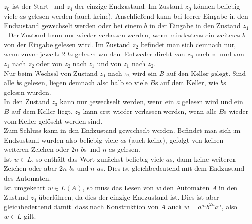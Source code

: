 \documentclass[10pt,a4paper,oneside,ngerman,numbers=noenddot]{scrartcl}
\begin{document}
\subsection{} %
$z_{0}$ ist der Start- und $z_{4}$ der einzige Endzustand. Im Zustand $z_{0}$ können beliebig viele $a$s gelesen werden (auch keine). Anschließend kann bei leerer Eingabe in den Endzustand gewechselt werden oder bei einem $b$ in der Eingabe in den Zustand $z_{1}$. Der Zustand kann nur wieder verlassen werden, wenn mindestens ein weiteres $b$ von der Eingabe gelesen wird. Im Zustand $z_{2}$ befindet man sich demnach nur, wenn zuvor jeweils 2 $b$s gelesen wurden. Entweder direkt von $z_{0}$ nach $z_{1}$ und von $z_{1}$ nach $z_{2}$ oder von $z_{2}$ nach $z_{1}$ und von $z_{1}$ nach $z_{2}$.\\
Nur beim Wechsel von Zustand $z_{1}$ nach $z_{2}$ wird ein $B$ auf den Keller gelegt. Sind alle $b$s gelesen, liegen demnach also halb so viele $B$s auf dem Keller, wie $b$s gelesen wurden.\\
In den Zustand $z_{3}$ kann nur gewechselt werden, wenn ein $a$ gelesen wird und ein $B$ auf dem Keller liegt. $z_{3}$ kann erst wieder verlassen werden, wenn alle $B$s wieder vom Keller gelöscht worden sind.\\
Zum Schluss kann in den Endzustand gewechselt werden. Befindet man sich im Endzustand wurden also beliebig viele $a$s (auch keine), gefolgt von keinen weiteren Zeichen oder $2n$ $b$s und $n$ $a$s gelesen.\\
Ist $w \in L$, so enthält das Wort zunächst beliebig viele $a$s, dann keine weiteren Zeichen oder aber $2n$ $b$s und $n$ $a$s. Dies ist gleichbedeutend mit dem Endzustand des Automaten.\\
Ist umgekehrt $w \in L(A)$, so muss das Lesen von $w$ den Automaten $A$ in den Zustand $z_{4}$ überführen, da dies der einzige Endzustand ist. Dies ist aber gleichbedeutend damit, dass nach Konstruktion von $A$ auch $w = a^{m}b^{2n}a^{n}$, also $w \in L$ gilt.
\subsection{} %
\end{document}
